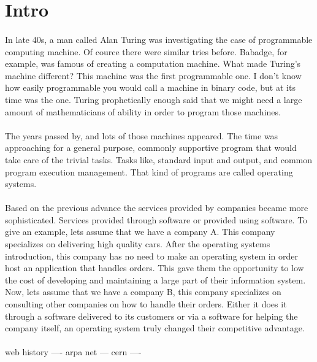 \section{Intro}

\paragraph{} In late 40s, a man called Alan Turing was investigating the case of programmable computing machine. Of cource there were similar tries before. Babadge, for example, was famous of creating a computation machine. What made Turing's machine different? This machine was the first programmable one. I don't know how easily programmable you would call a machine in binary code, but at its time was the one. Turing prophetically enough said that we might need a large amount of mathematicians of ability in order to program those machines.

\paragraph{} The years passed by, and lots of those machines appeared. The time was approaching for a general purpose, commonly supportive program that would take care of the trivial tasks. Tasks like, standard input and output, and common program execution management. That kind of programs are called operating systems.

\paragraph{} Based on the previous advance the services provided by companies became more sophisticated. Services provided through software or provided using software. To give an example, lets assume that we have a company A. This company specializes on delivering high quality cars. After the operating systems introduction, this company has no need to make an operating system in order host an application that handles orders. This gave them the opportunity to low the cost of developing and maintaining a large part of their information system. Now, lets assume that we have a company B, this company specializes on consulting other companies on how to handle their orders. Either it does it through a software delivered to its customers or via a software for helping the company itself, an operating system truly changed their competitive advantage.


\paragraph{} web history ---- arpa net --- cern ---- 

